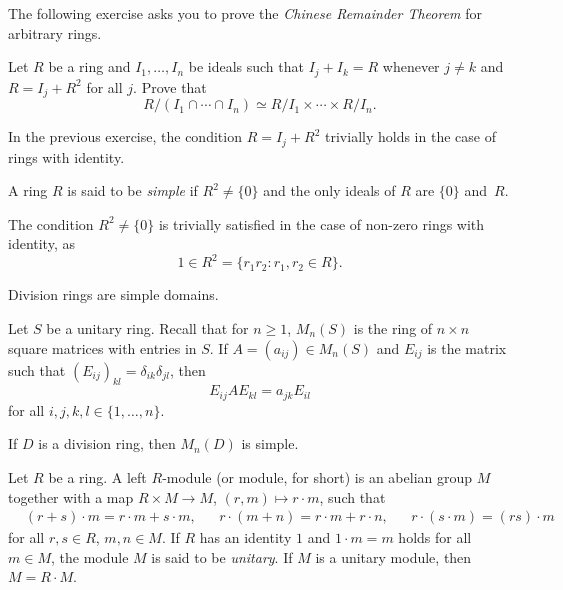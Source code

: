 The following exercise asks you to prove the \emph{Chinese Remainder Theorem}  
for arbitrary rings.

\begin{bonus}
    \label{xca:chinese}
    Let $R$ be a ring and $I_1,\dots,I_n$ be ideals such that 
    $I_j+I_k=R$ whenever $j\ne k$ and $R=I_j+R^2$ for all $j$. Prove that 
    \[
    R/(I_1\cap\cdots\cap I_n)\simeq R/I_1\times\cdots\times R/I_n.
    \]
\end{bonus}

In the previous exercise, the condition $R=I_j+R^2$ trivially holds in the case
of rings with identity. 

\begin{definition}
A ring $R$ is said to be \emph{simple} if $R^2\ne\{0\}$ and the only ideals of 
$R$ are $\{0\}$ and~$R$.  
\end{definition}

The condition $R^2\ne\{0\}$ is trivially satisfied in the case of non-zero
rings with identity, as 
\[
1\in R^2=\{r_1r_2:r_1,r_2\in R\}.
\]

\begin{example}
    \label{exa:division=>simple}
	Division rings are simple domains.
\end{example}

Let $S$ be a unitary ring. Recall that for $n\geq1$, $M_n(S)$ is the ring of $n\times n$
square matrices with entries in $S$.  If $A=(a_{ij})\in M_n(S)$ and $E_{ij}$ is
the matrix such that $(E_{ij})_{kl}=\delta_{ik}\delta_{jl}$, then
\begin{equation}
	\label{eq:trick}
E_{ij}AE_{kl}=a_{jk}E_{il}
\end{equation}
for all $i,j,k,l\in\{1,\dots,n\}$. 

\begin{example}
	If $D$ is a division ring, then $M_n(D)$ is simple. 
\end{example}

Let $R$ be a ring. A left $R$-module (or module, for short)  
is an abelian group $M$ together with a map $R\times M\to M$, $(r,m)\mapsto r\cdot m$, such that
\begin{align*}
	&(r+s)\cdot m=r\cdot m+s\cdot m, &&
	r\cdot (m+n)=r\cdot m+r\cdot n, && r\cdot (s\cdot m)=(rs)\cdot m    
\end{align*}
for all $r,s\in R$, $m,n\in M$.  If $R$ has an identity 
$1$ and $1\cdot m=m$ holds for all $m\in M$, the module $M$ is said to be 
\emph{unitary}.  If $M$ is a unitary module, then $M=R\cdot M$. %

